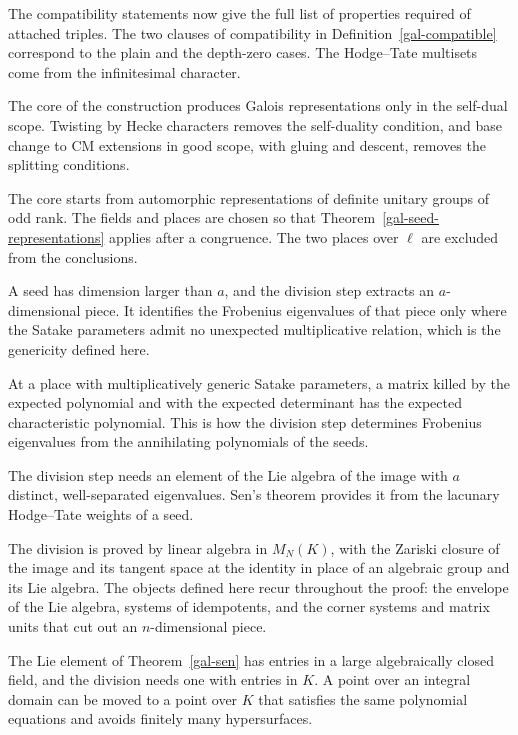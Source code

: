 The compatibility statements now give the full list of properties required of attached triples. The
two clauses of compatibility in Definition~\ref{gal-compatible} correspond to the plain and the
depth-zero cases. The Hodge--Tate multisets come from the infinitesimal character.

The core of the construction produces Galois representations only in the self-dual scope. Twisting by
Hecke characters removes the self-duality condition, and base change to CM extensions in good scope,
with gluing and descent, removes the splitting conditions.

The core starts from automorphic representations of definite unitary groups of odd rank. The fields
and places are chosen so that Theorem~\ref{gal-seed-representations} applies after a congruence. The
two places over $\ell$ are excluded from the conclusions.

A seed has dimension larger than $a$, and the division step extracts an $a$-dimensional piece. It
identifies the Frobenius eigenvalues of that piece only where the Satake parameters admit no unexpected
multiplicative relation, which is the genericity defined here.

At a place with multiplicatively generic Satake parameters, a matrix killed by the expected polynomial
and with the expected determinant has the expected characteristic polynomial. This is how the division
step determines Frobenius eigenvalues from the annihilating polynomials of the seeds.

The division step needs an element of the Lie algebra of the image with $a$ distinct, well-separated
eigenvalues. Sen's theorem provides it from the lacunary Hodge--Tate weights of a seed.

The division is proved by linear algebra in $M_N(K)$, with the Zariski closure of the image and its
tangent space at the identity in place of an algebraic group and its Lie algebra. The objects defined
here recur throughout the proof: the envelope of the Lie algebra, systems of idempotents, and the
corner systems and matrix units that cut out an $n$-dimensional piece.

The Lie element of Theorem~\ref{gal-sen} has entries in a large algebraically closed field, and the
division needs one with entries in $K$. A point over an integral domain can be moved to a point over
$K$ that satisfies the same polynomial equations and avoids finitely many hypersurfaces.

